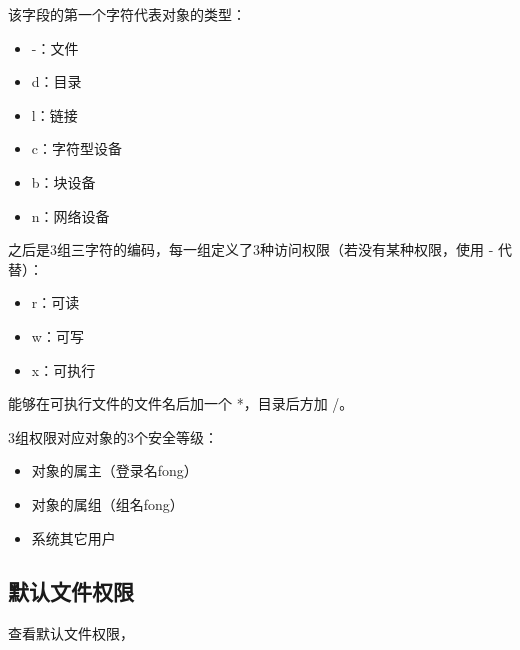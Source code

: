 \documentclass[letterpaper,10pt,english]{sphinxmanual}
\begin{document}
%
\begin{sphinxVerbatim}[commandchars=\\\{\}]
          
\end{sphinxVerbatim}

该字段的第一个字符代表对象的类型：
\begin{itemize}
\item {} 
-：文件

\item {} 
d：目录

\item {} 
l：链接

\item {} 
c：字符型设备

\item {} 
b：块设备

\item {} 
n：网络设备

\end{itemize}

之后是3组三字符的编码，每一组定义了3种访问权限（若没有某种权限，使用 - 代替）：
\begin{itemize}
\item {} 
r：可读

\item {} 
w：可写

\item {} 
x：可执行

\end{itemize}

 能够在可执行文件的文件名后加一个 *，目录后方加 /。

3组权限对应对象的3个安全等级：
\begin{itemize}
\item {} 
对象的属主（登录名fong）

\item {} 
对象的属组（组名fong）

\item {} 
系统其它用户

\end{itemize}


\subsection{默认文件权限}
\label{\detokenize{linux/03_authority:id3}}
 查看默认文件权限，
\end{document}

